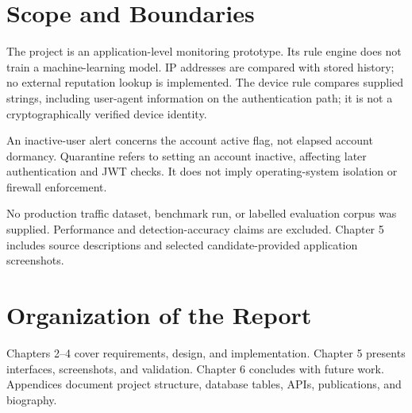 \section{Scope and Boundaries}
The project is an application-level monitoring prototype. Its rule engine does not train a machine-learning model. IP addresses are compared with stored history; no external reputation lookup is implemented. The device rule compares supplied strings, including user-agent information on the authentication path; it is not a cryptographically verified device identity.

An inactive-user alert concerns the account active flag, not elapsed account dormancy. Quarantine refers to setting an account inactive, affecting later authentication and JWT checks. It does not imply operating-system isolation or firewall enforcement.

No production traffic dataset, benchmark run, or labelled evaluation corpus was supplied. Performance and detection-accuracy claims are excluded. Chapter 5 includes source descriptions and selected candidate-provided application screenshots.

\section{Organization of the Report}
Chapters 2--4 cover requirements, design, and implementation. Chapter 5 presents interfaces, screenshots, and validation. Chapter 6 concludes with future work. Appendices document project structure, database tables, APIs, publications, and biography.
